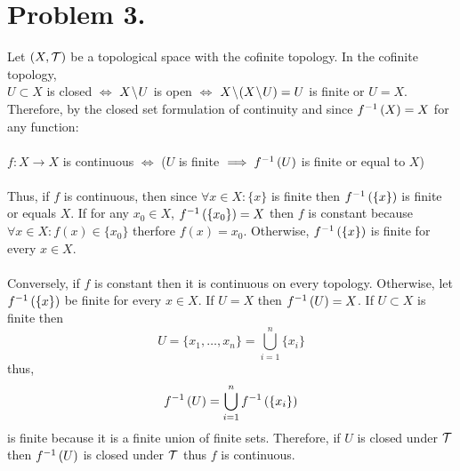 \documentclass[12pt]{extarticle}
\begin{document}
\section*{Problem 3.} 
Let $\left(X, \mathcal{T}\right)$ be a topological space with the cofinite topology. In the cofinite topology, \\ $U \subset X$ is closed $\iff$ $X \! \setminus \! U$ is open $\iff$ $X \! \setminus \! \left( X \! \setminus \! U \right) = U$ is finite or $U = X$. Therefore, by the closed set formulation of continuity and since $f^{-1} \left( X \right) = X$ for any function: \\ \\  $f : X \rightarrow X$ is continuous $\iff$ ($U$ is finite $\implies f^{-1} \left( U \right)$ is finite or equal to $X$)  \\ \\ 
Thus, if $f$ is continuous, then since $\forall x\in X : \{x\}$ is finite then $f^{-1} \left( \{x\} \right)$ is finite or equals $X$. If for any $x_0 \in X$, $f^{-1} \left( \{x_0\} \right) = X$ then $f$ is constant because $\forall x \in X : f(x) \in \{ x_0 \}$ therfore $f(x) = x_0$. Otherwise, $f^{-1} \left( \{x\} \right)$ is finite for every $x \in X$. \\ \\
Conversely, if $f$ is constant then it is continuous on every topology. Otherwise, let $f^{-1} \left( \{ x \} \right)$ be finite for every $x \in X$. If $U = X$ then $f^{-1} \left( U \right) = X$. If $U \subset X$ is finite then \[U = \{x_1, \dots , x_n \} = \bigcup_{i = 1}^{n} \{ x_i \} \] thus, \[f^{-1} \left( U \right) = \bigcup_{i = 1}^{n} f^{-1} \left( \{ x_i \} \right) \] is finite because it is a finite union of finite sets. Therefore, if $U$ is closed under $\mathcal{T}$ then $f^{-1} \left( U \right)$ is closed under $\mathcal{T}$ thus $f$ is continuous. 
\end{document}
